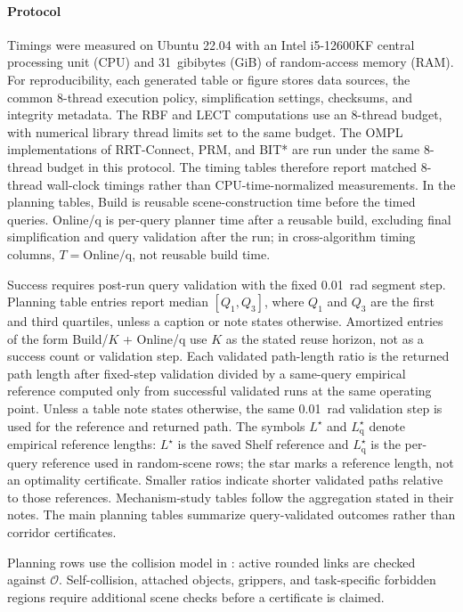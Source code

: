 \documentclass[journal]{IEEEtran}
\DeclareRobustCommand{\textsc}[1]{\textnormal{\MakeUppercase{#1}}}
\newcommand{\rbf}{\textsc{RBF}}
\newcommand{\calO}{\ensuremath{\mathcal{O}}}
\newcommand{\onlineq}{\mbox{Online/q}}
\begin{document}
\paragraph{Protocol}
Timings were measured on Ubuntu 22.04 with an Intel i5-12600KF central
processing unit (CPU) and 31~gibibytes (GiB) of random-access memory (RAM)\@.
For reproducibility, each generated table or figure stores data sources, the
common 8-thread execution policy, simplification settings, checksums, and
integrity metadata. The \rbf{} and LECT computations use an 8-thread budget,
with numerical library thread limits set to the same budget. The OMPL
implementations of \mbox{RRT-Connect}, PRM, and BIT* are run under the same
8-thread budget in this protocol. The timing tables therefore report matched
8-thread wall-clock timings rather than CPU-time-normalized measurements.
In the planning tables, Build is reusable scene-construction time before the
timed queries.
\onlineq{} is per-query planner time after a reusable build, excluding final
simplification and query validation after the run; in cross-algorithm timing
columns, \(T=\onlineq{}\), not reusable build time.

Success requires post-run query validation with the fixed 0.01~rad
segment step. Planning table entries report median \([Q_1,Q_3]\), where \(Q_1\)
and \(Q_3\) are the first and third quartiles, unless a caption or note states
otherwise. Amortized entries of the form Build/\(K\) + \onlineq{} use \(K\) as
the stated reuse horizon, not as a success count or validation step. Each
validated path-length ratio is the returned path length after fixed-step
validation divided by a same-query empirical reference computed only from
successful validated runs at the same operating point. Unless a table note
states otherwise, the same 0.01~rad validation step is used for the reference
and returned path.
The symbols \(L^\star\) and \(L^\star_{\mathrm{q}}\) denote empirical reference
lengths: \(L^\star\) is the saved Shelf reference and
\(L^\star_{\mathrm{q}}\) is the per-query reference used in random-scene rows;
the star marks a reference length, not an optimality certificate. Smaller ratios
indicate shorter validated paths relative to those references.
Mechanism-study tables follow the aggregation stated in their notes. The main
planning tables summarize query-validated outcomes rather than corridor
certificates.

\noindent
Planning rows use the collision model in : active
rounded links are checked against \(\calO\). Self-collision, attached objects,
grippers, and task-specific forbidden regions require additional scene checks
before a certificate is claimed.
\end{document}
